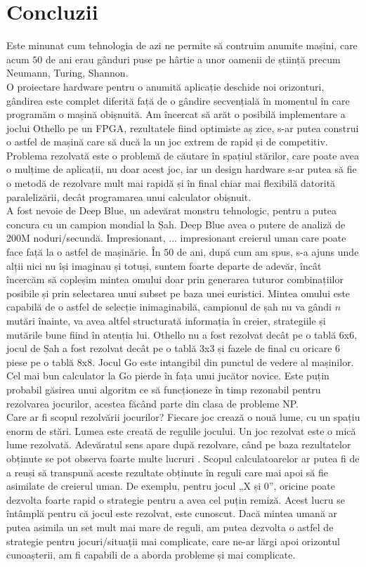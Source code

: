 \documentclass[12pt,twoside,a4paper,fleqn]{book}
\theoremstyle{definition}
\begin{document}
\chapter{Concluzii}
Este minunat cum tehnologia de azi ne permite să contruim anumite mașini, care acum $50$ de ani erau gânduri puse pe hârtie a unor oamenii de știință precum Neumann, Turing, Shannon.\\
O proiectare hardware pentru o anumită aplicație deschide noi orizonturi, gândirea este complet diferită față de o gândire secvențială în momentul în care programăm o mașină obișnuită. Am încercat să arăt o posibilă implementare a joclui Othello pe un FPGA, rezultatele fiind optimiste aș zice, s-ar putea construi o astfel de mașină care să ducă la un joc extrem de rapid și de competitiv. Problema rezolvată este o problemă de căutare în spațiul stărilor, care poate avea o mulțime de aplicații, nu doar acest joc, iar un design hardware s-ar putea să fie o metodă de rezolvare mult mai rapidă și în final chiar mai flexibilă datorită paralelizării, decât programarea unui calculator obișnuit.\\
A fost nevoie de Deep Blue, un adevărat monstru tehnologic, pentru a putea concura cu un campion mondial la Șah. Deep Blue avea o putere de analiză de 200M noduri/secundă. Impresionant, ... impresionant creierul uman care poate face față la o astfel de mașinărie. În $50$ de ani, după cum am spus, s-a ajuns unde alții nici nu își imaginau și totuși, suntem foarte departe de adevăr, încât încercăm să copleșim mintea omului doar prin generarea tuturor combinațiilor posibile și prin selectarea unui subset pe baza unei euristici. Mintea omului este capabilă de o astfel de selecție inimaginabilă, campionul de șah nu va gândi $n$ mutări înainte, va avea altfel structurată informația în creier, strategiile și mutările bune fiind în atenția lui. Othello nu a fost rezolvat decât pe o tablă 6x6, jocul de Șah a fost rezolvat decât pe o tablă 3x3 și fazele de final cu oricare 6 piese pe o tablă 8x8. Jocul Go este intangibil din punctul de vedere al mașinilor. Cel mai bun calculator la Go pierde în fața unui jucător novice.\cite{games_solved_herik} Este puțin probabil găsirea unui algoritm ce să funcționeze în timp rezonabil pentru rezolvarea jocurilor, acestea făcând parte din clasa de probleme NP.\\
Care ar fi scopul rezolvării jocurilor? Fiecare joc crează o nouă lume, cu un spațiu enorm de stări. Lumea este creată de regulile jocului. Un joc rezolvat este o mică lume rezolvată. Adevăratul sens apare după rezolvare, când pe baza rezultatelor obținute se pot observa foarte multe lucruri \cite{games_solved_herik}. Scopul calculatoarelor ar putea fi de a reuși să transpună aceste rezultate obținute în reguli care mai apoi să fie asimilate de creierul uman. De exemplu, pentru jocul „X și 0”, oricine poate dezvolta foarte rapid o strategie pentru a avea cel puțin remiză. Acest lucru se întâmplă pentru că jocul este rezolvat, este cunoscut. Dacă mintea umană ar putea asimila un set mult mai mare de reguli, am putea dezvolta o astfel de strategie pentru jocuri/situații mai complicate, care ne-ar lărgi apoi orizontul cunoașterii, am fi capabili de a aborda probleme și mai complicate.


\listoffigures{}



\end{document}
